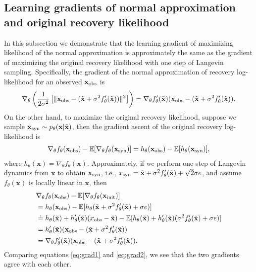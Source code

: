 \documentclass{article} \usepackage{iclr2021_conference,times}
\def\rvx{{\mathbf{x}}}
\newcommand{\E}{\mathbb{E}}
\def\trvx{\tilde{\rvx}}
\begin{document}
\subsection{Learning gradients of normal approximation and original recovery likelihood} \label{app:grad}
In this subsection we demonstrate that the learning gradient of maximizing likelihood of the normal approximation is approximately the same as the gradient of maximizing the original recovery likelihood with one step of Langevin sampling. Specifically, the gradient of the normal approximation of recovery log-likelihood for an observed $\rvx_{\rm obs}$ is
\begin{eqnarray} 
   \nabla_\theta \left(\frac{1}{2\sigma^2} \left[ \|\rvx_{\rm obs} - (\trvx + \sigma^2 f'_\theta(\trvx))\|^2\right]\right)  =  \nabla_\theta f'_\theta(\trvx)(\rvx_{\rm obs} - (\trvx + \sigma^2 f'_\theta(\trvx)). 
   \label{eq:grad1}
\end{eqnarray}
On the other hand, to maximize the original recovery likelihood, suppose we sample $\rvx_{\rm syn} \sim p_\theta(\rvx|\trvx)$, then the gradient ascent of the original recovery log-likelihood is
\begin{align} 
    \nabla_\theta f_\theta(\rvx_{\rm obs}) - \E[\nabla_\theta f_\theta(\rvx_{\rm syn})] = h_\theta(\rvx_{\rm obs}) - \E[h_\theta(\rvx_{\rm syn})], 
\end{align}
where $h_\theta(\rvx) = \nabla_\theta f_\theta(\rvx)$. Approximately, if we perform one step of Langevin dynamics from $\trvx$ to obtain $\rvx_{\rm syn}$, i.e., $x_{\rm syn} = \trvx + \sigma^2 f'_\theta(\trvx) + \sqrt{2}\sigma e$, and assume $f_\theta(\rvx)$ is locally linear in $\rvx$, then 
\begin{align} 
    & \nabla_\theta f_\theta(\rvx_{\rm obs}) - \E[\nabla_\theta f_\theta(\rvx_{\rm init})] \\
    &= 
          h_\theta(\rvx_{\rm obs}) - \E[h_\theta(\trvx + \sigma^2 f'_\theta(\trvx) + \sigma e)] \\
          & \doteq h_\theta(\trvx) + h'_\theta(\trvx) (x_{\rm obs} - \trvx) - 
          \E[h_\theta(\trvx) + h'_\theta(\trvx) (\sigma^2 f'_\theta(\trvx) + \sigma e)]\\
          &=h'_\theta(\trvx) (\rvx_{\rm obs} - (\trvx + \sigma^2 f'_\theta(\trvx)) \\
          &= \nabla_\theta f'_\theta(\trvx) (\rvx_{\rm obs} - (\trvx + \sigma^2 f'_\theta(\trvx)) .\label{eq:grad2}
\end{align}
Comparing equations \ref{eq:grad1} and \ref{eq:grad2}, we see that the two gradients agree with each other. 
\end{document}
